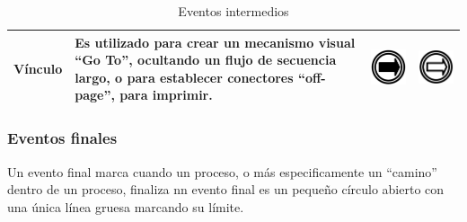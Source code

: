 \begin{table}[H]
\begin{tabular}{ |p{2cm}|p{9.5cm}|p{1.7cm}|p{1.7cm}|  }
		\hline
		{\small Vínculo } & {\small Es utilizado para crear un mecanismo visual ``Go To'', ocultando un flujo de secuencia largo, o para establecer conectores ``off-page'', para imprimir. } & \vspace{0.5mm} \hspace{2mm} \includegraphics[scale=0.2]{Capitulo2/imagenes/VinculoR} &\vspace{0.5mm} \hspace{2mm} \includegraphics[scale=0.2]{Capitulo2/imagenes/VinculoE} \\
		\hline
	\end{tabular}    
	\caption{Eventos intermedios \citep{stephena2009}}
	\label{tabla:Eventosintermedio}
\end{table}

\subsubsection{Eventos finales}
Un evento final marca cuando un proceso, o más especificamente un ``camino'' dentro de un proceso, finaliza nn evento final es un pequeño círculo abierto con una única línea gruesa marcando su límite.

